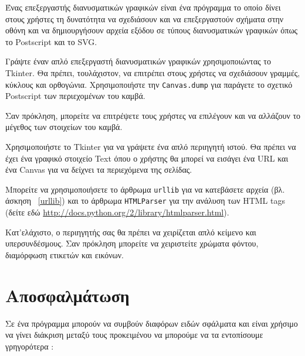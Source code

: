 \documentclass[10pt]{book}
\begin{document}
\begin{exercise}

Ένας επεξεργαστής διανυσματικών γραφικών είναι ένα πρόγραμμα το οποίο δίνει στους χρήστες 
τη δυνατότητα να σχεδιάσουν και να επεξεργαστούν σχήματα στην οθόνη και να δημιουργήσουν αρχεία εξόδου σε τύπους διανυσματικών γραφικών όπως το  Postscript  και το  SVG.

 Γράψτε έναν απλό επεξεργαστή διανυσματικών γραφικών χρησιμοποιώντας το  Tkinter.   
Θα πρέπει, τουλάχιστον, να επιτρέπει στους χρήστες να σχεδιάσουν γραμμές, κύκλους και ορθογώνια.  Χρησιμοποιήστε την  {\tt Canvas.dump}  για παράγετε το σχετικό  Postscript  των περιεχομένων του καμβά.

Σαν πρόκληση, μπορείτε να επιτρέψετε τους χρήστες να επιλέγουν και να αλλάζουν το μέγεθος 
των στοιχείων του καμβά. 


\end{exercise}



\begin{exercise}

Χρησιμοποιήστε το  Tkinter  για να γράψετε ένα απλό περιηγητή ιστού.  Θα πρέπει να 
έχει ένα γραφικό στοιχείο  Text  όπου ο χρήστης θα μπορεί να εισάγει ένα  URL  και 
ένα  Canvas  για να δείχνει τα περιεχόμενα της σελίδας.

Μπορείτε να χρησιμοποιήσετε το άρθρωμα  {\tt urllib}  για να κατεβάσετε αρχεία (βλ. άσκηση~ \ref{urllib})  και το άρθρωμα  {\tt HTMLParser}  για την ανάλυση των  
HTML tags  (δείτε εδώ  \url{http://docs.python.org/2/library/htmlparser.html}).

 Κατ'ελάχιστο, ο περιηγητής σας θα πρέπει να χειρίζεται απλό κείμενο και υπερσυνδέσμους.  Σαν πρόκληση μπορείτε να χειριστείτε χρώματα φόντου, διαμόρφωση ετικετών και εικόνων.

\end{exercise}




\appendix

\chapter{Αποσφαλμάτωση}

Σε ένα πρόγραμμα μπορούν να συμβούν διαφόρων ειδών σφάλματα και είναι χρήσιμο 
να γίνει διάκριση μεταξύ τους προκειμένου να μπορούμε να τα εντοπίσουμε γρηγορότερα :
\end{document}
